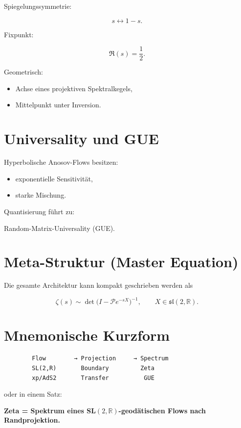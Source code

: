 \documentclass[a4paper,11pt]{article}
\begin{document}
	Spiegelungssymmetrie:
	
	\[
	s \leftrightarrow 1-s.
	\]
	
	Fixpunkt:
	
	\[
	\Re(s)=\frac12.
	\]
	
	Geometrisch:
	
	\begin{itemize}
		\item Achse eines projektiven Spektralkegels,
		\item Mittelpunkt unter Inversion.
	\end{itemize}
	
	\section{Universality und GUE}
	
	Hyperbolische Anosov-Flows besitzen:
	
	\begin{itemize}
		\item exponentielle Sensitivität,
		\item starke Mischung.
	\end{itemize}
	
	Quantisierung führt zu:
	
	\begin{center}
		Random-Matrix-Universality (GUE).
	\end{center}
	
	\section{Meta-Struktur (Master Equation)}
	
	Die gesamte Architektur kann kompakt geschrieben werden als
	
	\[
	\boxed{
		\zeta(s)
		\sim
		\det\!\Big(I - \mathcal P e^{-sX}\Big)^{-1},
		\qquad
		X\in\mathfrak{sl}(2,\mathbb{R}).
	}
	\]
	
	\section{Mnemonische Kurzform}
	
	\begin{verbatim}
		Flow        → Projection     → Spectrum
		SL(2,R)       Boundary         Zeta
		xp/AdS2       Transfer          GUE
	\end{verbatim}
	
	oder in einem Satz:
	
	\begin{center}
		\textbf{Zeta = Spektrum eines SL$(2,\mathbb{R})$-geodätischen Flows nach Randprojektion.}
	\end{center}
	
	
\end{document}
